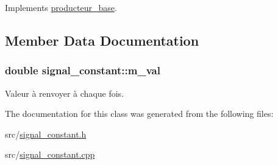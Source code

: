 Implements \hyperlink{classproducteur__base_af1e171c9e69b0998d5124c7389737f82}{producteur\-\_\-base}.



\subsection{Member Data Documentation}
\hypertarget{classsignal__constant_a750ff715be3882c6838312ffddf025b8}{
\subsubsection[{m\-\_\-val}]{\setlength{\rightskip}{0pt plus 5cm}double signal\-\_\-constant\-::m\-\_\-val\hspace{0.3cm}{\ttfamily [private]}}}\label{classsignal__constant_a750ff715be3882c6838312ffddf025b8}
Valeur à renvoyer à chaque fois. 

The documentation for this class was generated from the following files\-:\begin{DoxyCompactItemize}
\item 
src/\hyperlink{signal__constant_8h}{signal\-\_\-constant.\-h}\item 
src/\hyperlink{signal__constant_8cpp}{signal\-\_\-constant.\-cpp}\end{DoxyCompactItemize}
